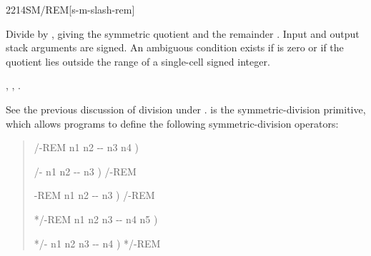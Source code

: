 \begin{worddef}{2214}{SM/REM}[s-m-slash-rem]
\item {}

	Divide  by , giving the symmetric quotient
	 and the remainder . Input and output stack
	arguments are signed. An ambiguous condition exists if 
	is zero or if the quotient lies outside the range of a single-cell
	signed integer.

\see {},
	,
	.

	\begin{defer}
	\rationale %
		See the previous discussion of division under .
		 is the symmetric-division primitive, which allows
		programs to define the following symmetric-division operators:

		\begin{quote}\ttfamily
			\word{:} /-REM  n1 n2 -{}- n3 n4 )
				   
			\word{;}

			\word{:} /-  n1 n2 -{}- n3 )
				/-REM  
			\word{;}

			\word{:} -REM  n1 n2 -{}- n3 )
				/-REM 
			\word{;}

			\word{:} */-REM  n1 n2 n3 -{}- n4 n5 )
				   
			\word{;}

			\word{:} */-  n1 n2 n3 -{}- n4 )
				*/-REM  
			\word{;}
		\end{quote}


\end{defer}
\end{worddef}
